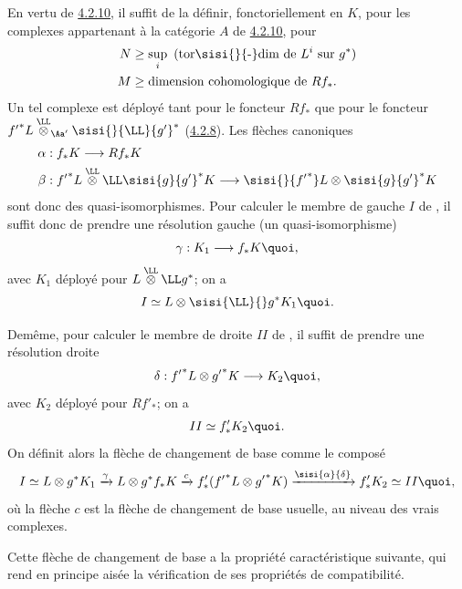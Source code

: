 \documentclass[10pt]{../fichiers-configuration-latex/smfart}
\begin{document}
En vertu de \hyperref[XVII.prop4.2.10]{4.2.10}, il suffit de la définir, fonctoriellement en $K$,
pour les complexes appartenant à la catégorie $A$ de \hyperref[XVII.prop4.2.10]{4.2.10}, pour
\begin{align*}
N & \geq\sup_i \text{ (tor\sisi{}{-}dim de $L^{i}$ sur
$g^{\ast}$)}\\
M & \geq\text{dimension cohomologique de $Rf_{\ast}$}.
\end{align*}
Un tel complexe est déployé tant pour le foncteur $Rf_{\ast}$ que pour
le foncteur ${f'}^{\ast}L\overset{\LL}{\otimes}_{\Aa'}\sisi{}{\LL}{g'}^{\ast}$
(\hyperref[XVII.lem4.2.8]{4.2.8}). Les flèches canoniques
\begin{align*}
\alpha &: f_{\ast}K\longrightarrow Rf_{\ast}K\\
\beta &:
{f'}^{\ast}L\overset{\LL}{\otimes}\LL \sisi{g}{{g'}}^{\ast}K\longrightarrow
\sisi{}{{f'}^*}L\otimes \sisi{g}{{g'}}^{\ast}K
\end{align*}
sont donc des quasi-isomorphismes. Pour calculer le membre de gauche
$I$ de , il suffit donc de prendre une résolution gauche
(\ie un quasi-isomorphisme)
\[
\gamma:K_{1}\longrightarrow f_{\ast}K{\quoi},
\]
avec $K_{1}$ déployé pour
$L\overset{\LL}{\otimes}\LL g^{\ast}$; on
a
\[
I\simeq L\otimes \sisi{\LL}{} g^{\ast}K_{1}{\quoi}.
\]

De\pageoriginale même, pour calculer le membre de droite $II$ de
, il suffit de prendre une résolution droite
\[
\delta:{f'}^{\ast}L\otimes {g'}^{\ast}K\longrightarrow K_2{\quoi},
\]
avec $K_{2}$ déployé pour $Rf'_{\ast}$; on a
\[
II\simeq f'_{\ast}K_{2}{\quoi}.
\]
On définit alors la flèche de changement de base comme le composé
\[
I\simeq L\otimes g^{\ast}K_{1}\xrightarrow{\gamma}L\otimes
g^{\ast}f_{\ast}K\xrightarrow{c}f'_{\ast}({f'}^{\ast}L\otimes
{g'}^{\ast}K)\xrightarrow{\sisi{\alpha}{\delta}}f'_{\ast}K_{2}\simeq II{\quoi},
\]
où la flèche $c$ est la flèche de changement de base
usuelle, au niveau des vrais complexes.

Cette flèche de changement de base a la propriété caractéristique
suivante, qui rend en principe aisée la vérification de ses propriétés
de compatibilité.
\end{document}
